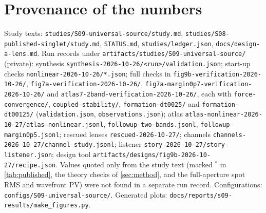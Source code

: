 \documentclass[11pt,a4paper]{article}
\numberwithin{equation}{section}
\newcommand{\file}[1]{\nolinkurl{#1}}
\begin{document}
\section*{Provenance of the numbers}\label{sec:provenance}
\begingroup\small\raggedright
Study texts: \file{studies/S09-universal-source/study.md},
\file{studies/S08-published-singlet/study.md}, \file{STATUS.md},
\file{studies/ledger.json}, \file{docs/design-a-lens.md}. Run records under
\file{artifacts/studies/S09-universal-source/} (private): synthesis
\file{synthesis-2026-10-26/<run>/validation.json}; start-up checks
\file{nonlinear-2026-10-26/*.json}; full checks in
\file{fig9b-verification-2026-10-26/}, \file{fig7a-verification-2026-10-26/},
\file{fig7a-margin0p7-verification-2026-10-26/} and
\file{atlas7-2band-verification-2026-10-26/}, each with
\file{force-convergence/}, \file{coupled-stability/}, \file{formation-dt0025/}
and \file{formation-dt00125/} (\file{validation.json}, \file{observations.json}); atlas \file{atlas-nonlinear-2026-10-27/atlas-nonlinear.jsonl},
\file{followup-two-bands.jsonl}, \file{followup-margin0p5.jsonl}; rescued lenses
\file{rescued-2026-10-27/}; channels \file{channels-2026-10-27/channel-study.jsonl};
listener \file{story-2026-10-27/story-listener.json}; design tool
\file{artifacts/designs/fig9b-2026-10-27/recipe.json}. Values quoted only from
the study text (marked $^\ast$ in \cref{tab:published}, the theory checks of
\cref{sec:method}, and the full-aperture spot RMS and wavefront PV) were not found
in a separate run record. Configurations: \file{configs/S09-universal-source/}.
Generated plots: \file{docs/reports/s09-results/make_figures.py}.
\par\endgroup

\printbibliography[heading=bibintoc,title={References}]
\end{document}
